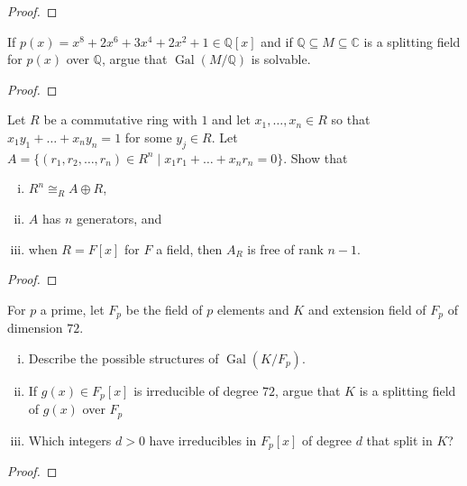 \documentclass{article}
\newenvironment{problem}[2][Problem]{\begin{trivlist}
\item[\hskip \labelsep {\bfseries #1}\hskip \labelsep {\bfseries #2.}]}{\end{trivlist}}
\newcommand{\Q}{\mathbb Q}
\newcommand{\C}{\mathbb C}
\newcommand{\set}[1]{\{#1\}}
\newcommand{\Gal}{\operatorname{Gal}}
\begin{document}
\begin{proof}
\end{proof}
\pagebreak

\begin{problem}{4}
  If $p(x) = x^8 + 2x^6 + 3x^4 + 2x^2 + 1 \in \Q[x]$ and if
  $\Q \subseteq M \subseteq \C$ is a splitting field for $p(x)$ over $\Q$,
  argue that $\Gal(M/\Q)$ is solvable.
\end{problem}

\begin{proof}
\end{proof}
\pagebreak

\begin{problem}{5}
  Let $R$ be a commutative ring with $1$ and let $x_1, \hdots, x_n \in R$
  so that $x_1y_1 + \hdots + x_ny_n = 1$ for some $y_j \in R$. Let
  $A = \set{(r_1, r_2, \hdots, r_n) \in R^n \mid x_1r_1 + \hdots + x_nr_n = 0}.$
  Show that \begin{enumerate}[(i)]
    \item $R^n \cong_R A \oplus R$,
    \item $A$ has $n$ generators, and
    \item when $R = F[x]$ for $F$ a field, then $A_R$ is free of rank $n-1$.
  \end{enumerate}
\end{problem}

\begin{proof}
\end{proof}
\pagebreak

\begin{problem}{6}
  For $p$ a prime, let $F_p$ be the field of $p$ elements and $K$ and extension
  field of $F_p$ of dimension $72$. \begin{enumerate}[(i)]
    \item Describe the possible structures of $\Gal(K/F_p)$.
    \item If $g(x) \in F_p[x]$ is irreducible of degree $72$, argue that $K$ is
      a splitting field of $g(x)$ over $F_p$
    \item Which integers $d > 0$ have irreducibles in $F_p[x]$ of degree $d$
      that split in $K$?
  \end{enumerate}
\end{problem}

\begin{proof}
\end{proof}
\end{document}
